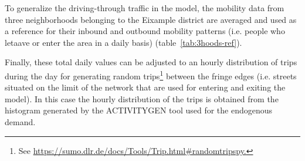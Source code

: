 \documentclass[11pt]{article}
\begin{document}
To generalize the driving-through traffic in the model, the mobility data from three neighborhoods belonging to the Eixample district are averaged and used as a reference for their inbound and outbound mobility patterns (i.e. people who letaave or enter the area in a daily basis) \citep{BestiarioProyectosS.L.2014} (table~\ref{tab:3hoods-ref}).

\begin{table}[htbp!]
\centering
\caption{Demographic and mobility data from referenced neighborhoods and used in model.}
\label{tab:3hoods-ref}
\end{table}

Finally, these total daily values can be adjusted to an hourly distribution of trips during the day for generating random trips\footnote{See \url{ https://sumo.dlr.de/docs/Tools/Trip.html#randomtripspy.}} between the fringe edges (i.e. streets situated on the limit of the network that are used for entering and exiting the model). In this case the hourly distribution of the trips is obtained from the histogram generated by the ACTIVITYGEN tool used for the endogenous demand. 
\end{document}
